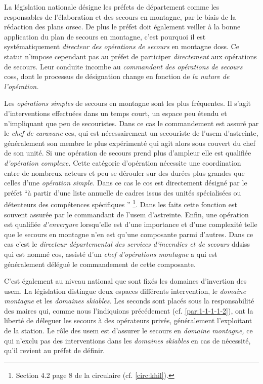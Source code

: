 La législation nationale désigne les préfets de département comme les
responsables de l'élaboration et des secours en montagne, par le biais
de la rédaction des plans \ac{orsec}. De plus le préfet doit également
veiller à la bonne application du plan de secours en montagne, c'est
pourquoi il est systématiquement \emph{directeur des opérations de
  secours} en montagne \acp{dos}. Ce statut n'impose cependant pas au
préfet de participer \emph{directement} aux opérations de
secours. Leur conduite incombe au \emph{commandant des opérations de
  secours} \acp{cos}, dont le processus de désignation change en
fonction de \emph{la nature de l'opération.}

Les \emph{opérations simples} de secours en montagne sont les plus
fréquentes. Il s'agit d'interventions effectuées dans un temps court,
un espace peu étendu et n'impliquant que peu de secouristes. Dans ce
cas le commandement est assuré par le \emph{chef de caravane}
\acp{cc}, qui est nécessairement un secouriste de l'\ac{usem}
d'astreinte, généralement son membre le plus expérimenté qui agit
alors sous couvert du chef de son unité. Si une opération de secours
prend plus d'ampleur elle est qualifiée \emph{d'opération complexe.}
Cette catégorie d'opération nécessite une coordination entre de
nombreux acteurs et peu se dérouler sur des durées plus grandes que
celles d'une \emph{opération simple.} Dans ce cas le \ac{cos} est
directement désigné par le préfet \enquote{à partir d’une liste
  annuelle de cadres issus des unités spécialisées ou détenteurs des
  compétences spécifiques \textelp{}} \footnote{Section 4.2 page 8 de
  la circulaire  (cf. \autoref{circ:khil}).}. Dans les faits
cette fonction est souvent assurée par le commandant de l'\ac{usem}
d'astreinte. Enfin, une opération est qualifiée \emph{d'envergure}
lorsqu'elle est d'une importance et d'une complexité telle que le
secours en montagne n'en est qu'une composante parmi d'autres. Dans ce
cas c'est le \emph{directeur départemental des services d'incendies et
  de secours} \acp{ddsis} qui est nommé \ac{cos}, assisté d'un
\emph{chef d'opérations montagne} a qui est généralement délégué le
commandement de cette composante.

C'est également au niveau national que sont fixés les domaines
d'invertion des \ac{usem}. La législation distingue deux espaces
différents intervention, le \emph{domaine montagne} et les
\emph{domaines skiables.} Les seconds sont placés sous la
responsabilité des maires qui, comme nous l'indiquions précédement
(cf. \autoref{par:1-1-1-1-2}), ont la liberté de déleguer les secours
à des opérateurs privés, généralement l'exploitant de la station. Le
rôle des \ac{usem} est d'assurer le secours en \emph{domaine
  montagne,} ce qui n'exclu pas des interventions dans les
\emph{domaines skiables} en cas de nécessité, qu'il revient au préfet
de définir.

